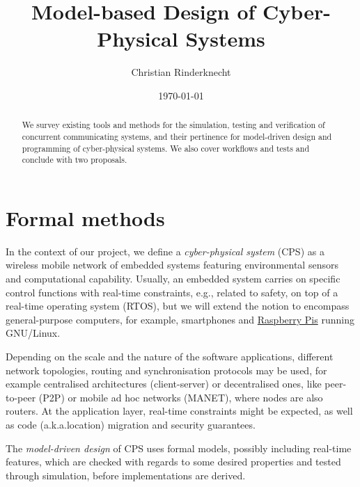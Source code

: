 \documentclass[a4paper,11pt,twoside]{article}
\title{Model-based Design of Cyber-Physical Systems}
\author{Christian Rinderknecht}
\date{\today}
\begin{document}
\maketitle

\begin{abstract}
We survey existing tools and methods for the simulation, testing and
verification of concurrent communicating systems, and their pertinence
for model-driven design and programming of cyber\hyp{}physical
systems. We also cover workflows and tests and conclude with two
proposals.
\end{abstract}

\section{Formal methods}

In the context of our project, we define a \emph{cyber-physical
  system} (CPS) as a wireless mobile network of embedded systems
featuring environmental sensors and computational capability. Usually,
an embedded system carries on specific control functions with
real\hyp{}time constraints, e.g., related to safety, on top of a
real\hyp{}time operating system (RTOS), but we will extend the notion
to encompass general\hyp{}purpose computers, for example, smartphones
and \href{http://www.raspberrypi.org/}{Raspberry Pis} running
GNU/Linux.

Depending on the scale and the nature of the software applications,
different network topologies, routing and synchronisation protocols
may be used, for example centralised architectures
(client\hyp{}server) or decentralised ones, like
peer\hyp{}to\hyp{}peer (P2P) or mobile ad hoc networks (MANET), where
nodes are also routers. At the application layer, real\hyp{}time
constraints might be expected, as well as code (a.k.a.\@ location)
migration and security guarantees.

The \emph{model-driven design} of CPS uses formal models, possibly
including real\hyp{}time features, which are checked with regards to
some desired properties and tested through simulation, before
implementations are derived.
\end{document}
